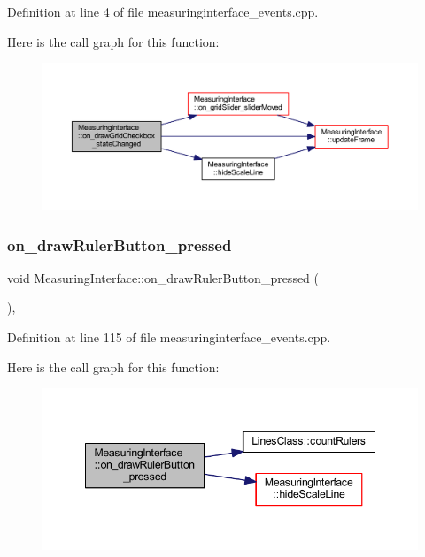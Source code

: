 Definition at line 4 of file measuringinterface\+\_\+events.\+cpp.

Here is the call graph for this function\+:
\nopagebreak
\begin{figure}[H]
\begin{center}
\leavevmode
\includegraphics[width=350pt]{class_measuring_interface_a37da2b051cdaef7769ac1f1f8a849753_cgraph}
\end{center}
\end{figure}
\mbox{\label{class_measuring_interface_a997fecc781bfc253f672a84a201ea846}} 
\subsubsection{\texorpdfstring{on\_drawRulerButton\_pressed}{on\_drawRulerButton\_pressed}}
{\footnotesize\ttfamily void Measuring\+Interface\+::on\+\_\+draw\+Ruler\+Button\+\_\+pressed (\begin{DoxyParamCaption}{ }\end{DoxyParamCaption})\hspace{0.3cm}{\ttfamily [private]}, {\ttfamily [slot]}}



Definition at line 115 of file measuringinterface\+\_\+events.\+cpp.

Here is the call graph for this function\+:
\nopagebreak
\begin{figure}[H]
\begin{center}
\leavevmode
\includegraphics[width=348pt]{class_measuring_interface_a997fecc781bfc253f672a84a201ea846_cgraph}
\end{center}
\end{figure}
\mbox{\label{class_measuring_interface_a310c3915895175fe1dc14d9234095de0}} 
